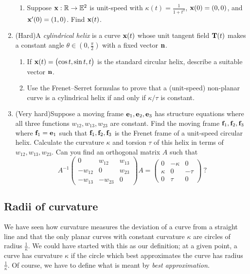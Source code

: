 \begin{exercises}
\begin{enumerate}
\begin{enumerate}
			\item Suppose ${\mathbf{x}}:\mathbb{R}\to\mathbb{E}^2$ is unit-speed with $\kappa(t)=\frac 1{1+t^2}$, ${\mathbf{x}}(0)=(0,0)$, and ${\mathbf{x}}'(0)=(1,0)$. Find ${\mathbf{x}}(t)$.
		\end{enumerate}
		
	
	  \item (Hard)\quad A \emph{cylindrical helix} is a curve ${\mathbf{x}}(t)$ whose unit tangent field ${\mathbf{T}}(t)$ makes a constant angle $\theta\in(0,\frac\pi 2)$ with a fixed vector ${\mathbf{n}}$.
		\begin{enumerate}
		  \item If ${\mathbf{x}}(t)=\bigl(\cos t,\sin t,t\bigr)$ is the standard circular helix, describe a suitable vector ${\mathbf{n}}$.
		  \item Use the Frenet--Serret formulas to prove that a (unit-speed) non-planar curve is a cylindrical helix if and only if $\kappa/\tau$ is constant.
	  \end{enumerate}
	  
	  \item (Very hard)\quad Suppose a moving frame ${\mathbf{e}}_1,{\mathbf{e}}_2,{\mathbf{e}}_3$ has structure equations where all three functions $w_{12},w_{13},w_{23}$ are constant. Find the moving frame ${\mathbf{f}}_1,{\mathbf{f}}_2,{\mathbf{f}}_3$ where ${\mathbf{f}}_1={\mathbf{e}}_1$ such that ${\mathbf{f}}_1,{\mathbf{f}}_2,{\mathbf{f}}_3$ is the Frenet frame of a unit-speed circular helix. Calculate the curvature $\kappa$ and torsion $\tau$ of this helix in terms of $w_{12},w_{13},w_{23}$. Can you find an orthogonal matrix $A$ such that
	  \[
	  	A^{-1}
	  	\begin{pmatrix}
		     0&w_{12}&w_{13}\\
		     -w_{12}&0&w_{23}\\
		     -w_{13}&-w_{23}&0
	     \end{pmatrix}
	     A=
	     \begin{pmatrix}
		     0&-\kappa&0\\
		     \kappa&0&-\tau\\
		     0&\tau&0
	     \end{pmatrix}
	     \ ?
	   \]
	\end{enumerate}
\end{exercises}


\clearpage




\subsection{Radii of curvature}\label{sec:radii}

We have seen how curvature measures the deviation of a curve from a straight line and that the only planar curves with constant curvature $\kappa$ are circles of radius $\frac 1\kappa$. We could have started with this as our definition; at a given point, a curve has curvature $\kappa$ if the circle which best approximates the curve has radius $\frac 1\kappa$. Of course, we have to define what is meant by \emph{best approximation.}

